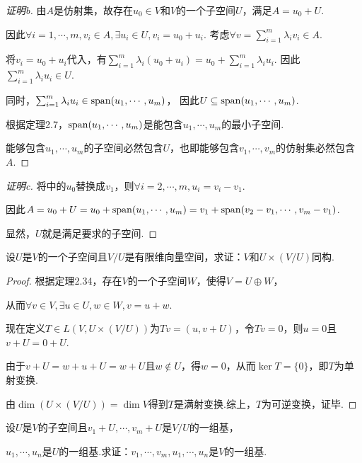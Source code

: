 \begin{proof}[证明b]
    由\(A\)是仿射集，故存在\(u_0 \in V\)和\(V\)的一个子空间\(U\)，满足\(A=u_0+U\).

    因此\(\forall i=1,\cdots,m,v_i \in A,\exists u_i \in U,v_i=u_0+u_i\).
    考虑\(\forall v=\sum_{i=1}^m \lambda_i v_i \in A\).
    
    将\(v_i=u_0+u_i\)代入，有\(\sum_{i=1}^m \lambda_i(u_0+u_i)=u_0+\sum_{i=1}^m \lambda_i u_i\).
    因此\(\sum_{i=1}^m \lambda_i u_i \in U\).
    
    同时，\(\sum_{i=1}^m \lambda_i u_i \in \operatorname{span} (u_1,\cdots,u_m)\)，
    因此\(U \subseteq \operatorname{span} (u_1,\cdots,u_m)\).
    
    根据定理2.7，\(\operatorname{span} (u_1,\cdots,u_m)\)是能包含\(u_1,\cdots,u_m\)的最小子空间.
    
    能够包含\(u_1,\cdots,u_m\)的子空间必然包含\(U\)，也即能够包含\(v_1,\cdots,v_m\)的仿射集必然包含\(A\).    
\end{proof}

\begin{proof}[证明c]
    将中的\(u_0\)替换成\(v_1\)，则\(\forall i=2,\cdots,m,u_i=v_i-v_1\).

    因此\(A=u_0+U=u_0+\operatorname{span} (u_1,\cdots,u_m)=v_1+\operatorname{span} (v_2-v_1,\cdots,v_m-v_1)\).

    显然，\(U\)就是满足要求的子空间.
\end{proof}

\begin{problem}[12]\label{3.E.12}
    设\(U\)是\(V\)的一个子空间且\(V/U\)是有限维向量空间，求证：\(V\)和\(U \times (V/U)\)同构.
\end{problem}

\begin{proof}
    根据定理2.34，存在\(V\)的一个子空间\(W\)，使得\(V=U \oplus W\)，

    从而\(\forall v \in V, \exists u \in U,w \in W,v=u+w\).
    
    现在定义\(T \in L(V,U \times (V/U))\)为\(Tv=(u,v+U)\)，令\(Tv=0\)，则\(u=0\)且\(v+U=0+U\).
    
    由于\(v+U=w+u+U=w+U\)且\(w \notin U\)，得\(w=0\)，从而\(\ker T=\{0\}\)，即\(T\)为单射变换.
    
    由\(\dim (U \times (V/U))=\dim V\)得到\(T\)是满射变换.综上，\(T\)为可逆变换，证毕.
\end{proof}

\begin{problem}[13]\label{3.E.13}
    设\(U\)是\(V\)的子空间且\(v_1+U,\cdots,v_m+U\)是\(V/U\)的一组基，
    
    \(u_1,\cdots,u_n\)是\(U\)的一组基.求证：\(v_1,\cdots,v_m,u_1,\cdots,u_n\)是\(V\)的一组基.
\end{problem}

